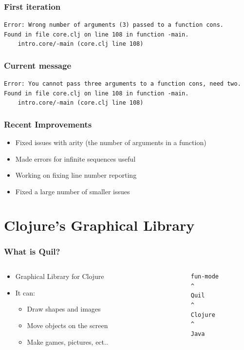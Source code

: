 \documentclass{beamer}
\begin{document}
\begin{frame}[fragile]
\frametitle{First iteration}
		\begin{verbatim}
Error: Wrong number of arguments (3) passed to a function cons.
Found in file core.clj on line 108 in function -main.
	intro.core/-main (core.clj line 108)
	\end{verbatim}	
\end{frame}

\begin{frame}[fragile]
\frametitle{Current message}
		\begin{verbatim}
Error: You cannot pass three arguments to a function cons, need two.
Found in file core.clj on line 108 in function -main.
	intro.core/-main (core.clj line 108)
	\end{verbatim}	
\end{frame}

\begin{frame}
	\frametitle{Recent Improvements}
	\begin{itemize}
		\item Fixed issues with arity (the number of arguments in a function)
		\item Made errors for infinite sequences useful
		\item Working on fixing line number reporting
		\item Fixed a large number of smaller issues
	\end{itemize}
\end{frame}

\section{Clojure's Graphical Library}

\begin{frame}[fragile]
	\frametitle{What is Quil?}

  		\begin{columns}[t]
		\begin{column}{.55\textwidth}
		\begin{itemize}
  		\item Graphical Library for Clojure
  		\item It can:
  		\begin{itemize}
  	 		\item Draw shapes and images
  	 		\item Move objects on the screen
  	 		\item Make games, pictures, ect..
  		\end{itemize}
  		\end{itemize}
		\end{column}
		\begin{column}{.45\textwidth}
			\begin{verbatim}
			fun-mode
			^
			Quil
			^
			Clojure
			^
			Java
			\end{verbatim}
		\end{column}
		\end{columns}
\end{frame}
\end{document}
